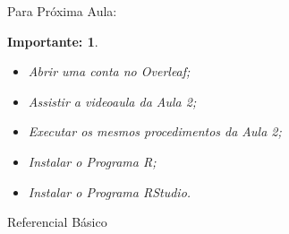 \documentclass{beamer}
\newtheorem{teoc}{Importante:} %
\begin{document}
\begin{frame}{Para Próxima Aula:}
    
	\begin{teoc}
        \begin{itemize}
			\item Abrir uma conta no Overleaf;
			\item Assistir a videoaula da Aula 2;
			\item Executar os mesmos procedimentos da Aula 2;
			\item Instalar o Programa R;
			\item Instalar o Programa RStudio.
		\end{itemize}
	\end{teoc}
	
\end{frame}


\begin{frame}{Referencial Básico}
    
\end{frame}

\end{document}
